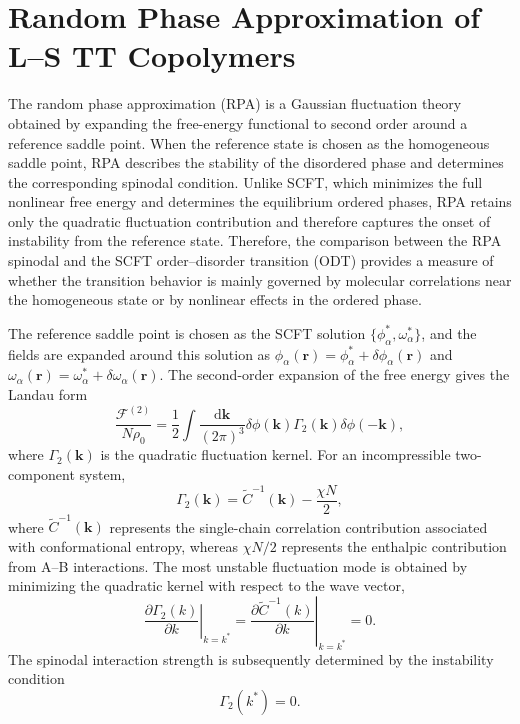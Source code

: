 \documentclass[journal=mamobx,manuscript=article]{achemso}
\begin{document}
\section{Random Phase Approximation of L--S TT Copolymers}\label{sec:RPA}

	The random phase approximation (RPA) is a Gaussian fluctuation theory obtained by expanding the free-energy functional to second order around a reference saddle point.
	When the reference state is chosen as the homogeneous saddle point, RPA describes the stability of the disordered phase and determines the corresponding spinodal condition.
	Unlike SCFT, which minimizes the full nonlinear free energy and determines the equilibrium ordered phases, RPA retains only the quadratic fluctuation contribution and therefore captures the onset of instability from the reference state.
	Therefore, the comparison between the RPA spinodal and the SCFT order--disorder transition (ODT) provides a measure of whether the transition behavior is mainly governed by molecular correlations near the homogeneous state or by nonlinear effects in the ordered phase\cite{Wang2008Microphase,Li2020Largely,Li2021Simplicity}.

	The reference saddle point is chosen as the SCFT solution $\{\phi_\alpha^\ast,\omega_\alpha^\ast\}$, and the fields are expanded around this solution as $\phi_\alpha(\bm r)=\phi_\alpha^\ast+\delta\phi_\alpha(\bm r)$ and $\omega_\alpha(\bm r)=\omega_\alpha^\ast+\delta\omega_\alpha(\bm r)$.
	The second-order expansion of the free energy gives the Landau form
	\begin{equation}
		\frac{\mathcal F^{(2)}}{N\rho_0}
		=
		\frac12
		\int
		\frac{\mathrm d\bm k}{(2\pi)^3}
		\delta\phi(\bm k)
		\Gamma_2(\bm k)
		\delta\phi(-\bm k),
		\label{eq:Gamma2}
	\end{equation}
	where $\Gamma_2(\bm k)$ is the quadratic fluctuation kernel.
	For an incompressible two-component system,
	\begin{equation}
		\Gamma_2(\bm k)
		=
		\widetilde C^{-1}(\bm k)
		-
		\frac{\chi N}{2},
		\label{eq:Gamma2Def}
	\end{equation}
	where $\widetilde C^{-1}(\bm k)$ represents the single-chain correlation contribution associated with conformational entropy, whereas $\chi N/2$ represents the enthalpic contribution from A--B interactions.
	The most unstable fluctuation mode is obtained by minimizing the quadratic kernel with respect to the wave vector,
	\begin{equation}
		\left.
		\frac{\partial \Gamma_2(k)}
		{\partial k}
		\right|_{k=k^\ast}
		=
		\left.
		\frac{\partial \widetilde C^{-1}(k)}
		{\partial k}
		\right|_{k=k^\ast}
		=
		0.
		\label{eq:RPAWavevector}
	\end{equation}
	The spinodal interaction strength is subsequently determined by the instability condition
	\begin{equation}
		\Gamma_2(k^\ast)=0.
		\label{eq:RPASpinodal}
	\end{equation}
\end{document}

